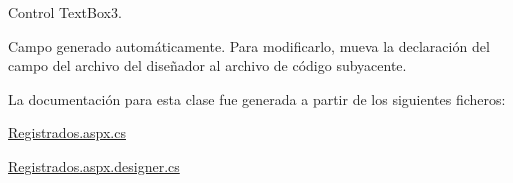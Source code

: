 Control Text\+Box3. 

Campo generado automáticamente. Para modificarlo, mueva la declaración del campo del archivo del diseñador al archivo de código subyacente. 

La documentación para esta clase fue generada a partir de los siguientes ficheros\+:\begin{DoxyCompactItemize}
\item 
\mbox{\hyperlink{Registrados_8aspx_8cs}{Registrados.\+aspx.\+cs}}\item 
\mbox{\hyperlink{Registrados_8aspx_8designer_8cs}{Registrados.\+aspx.\+designer.\+cs}}\end{DoxyCompactItemize}
